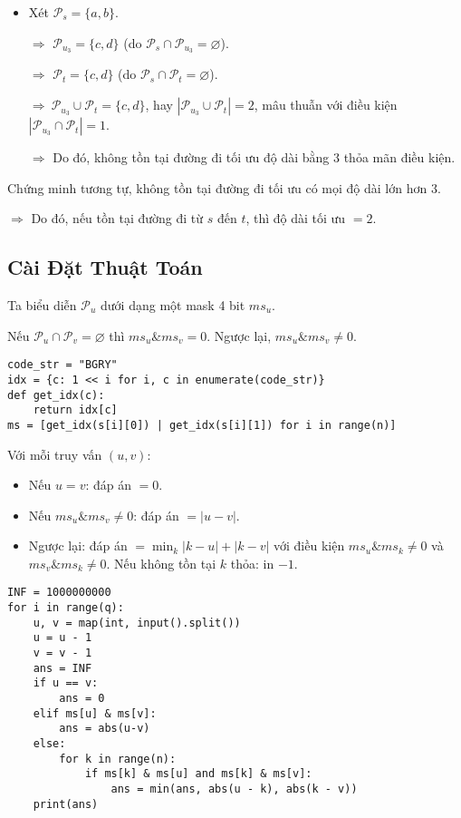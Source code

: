 \documentclass[12pt,a4paper]{article}
\begin{document}
\begin{itemize}
\begin{itemize}
		\item Xét $\mathcal{P}_s = \{a, b\}$.
		
		$\Rightarrow$ $\mathcal{P}_{u_3} = \{c, d\}$ (do $\mathcal{P}_{s} \cap \mathcal{P}_{u_3} = \varnothing$).
		
		$\Rightarrow$ $\mathcal{P}_{t} = \{c, d\}$ (do $\mathcal{P}_{s} \cap \mathcal{P}_{t} = \varnothing$).
		
		$\Rightarrow\ \mathcal{P}_{u_3} \cup \mathcal{P}_{t} = \{c, d\}$, hay $|\mathcal{P}_{u_3} \cup \mathcal{P}_{t}| = 2$, 
		mâu thuẫn với điều kiện $|\mathcal{P}_{u_3} \cap \mathcal{P}_{t}| = 1$.

		$\Rightarrow$ Do đó, không tồn tại đường đi tối ưu độ dài bằng $3$ thỏa mãn điều kiện.	

	\end{itemize}
	Chứng minh tương tự, không tồn tại đường đi tối ưu có mọi độ dài lớn hơn $3$.
	
	$\Rightarrow$ Do đó, nếu tồn tại đường đi từ $s$ đến $t$, thì độ dài tối ưu $= 2$.
	\end{itemize}

	\subsection{Cài Đặt Thuật Toán}
	
	Ta biểu diễn $\mathcal{P}_u$ dưới dạng một mask 4 bit $ms_u$.  
	
	Nếu $\mathcal{P}_u \cap \mathcal{P}_v = \varnothing$ thì $ms_u \& ms_v = 0$. 
	Ngược lại, $ms_u \& ms_v \ne 0$.
\begin{lstlisting}
code_str = "BGRY"
idx = {c: 1 << i for i, c in enumerate(code_str)}
def get_idx(c):
	return idx[c]
ms = [get_idx(s[i][0]) | get_idx(s[i][1]) for i in range(n)]
\end{lstlisting}
	Với mỗi truy vấn $(u, v)$:
	\begin{itemize}[nosep]
		\item Nếu $u = v$: đáp án $= 0$.
		\item Nếu $ms_u \& ms_v \ne 0$: đáp án $= |u - v|$.
		\item Ngược lại: đáp án $= \min_{k}|k - u| + |k - v|$ với điều kiện $ms_u \& ms_k \ne 0$ và $ms_v \& ms_k \ne 0$. Nếu không tồn tại $k$ thỏa: in $-1$.
		\end{itemize}

\begin{lstlisting}
INF = 1000000000
for i in range(q):
	u, v = map(int, input().split())
	u = u - 1
	v = v - 1
	ans = INF
	if u == v:
		ans = 0
	elif ms[u] & ms[v]:
		ans = abs(u-v)
	else:
		for k in range(n):
			if ms[k] & ms[u] and ms[k] & ms[v]:
				ans = min(ans, abs(u - k), abs(k - v))
	print(ans)
\end{lstlisting}
	
\end{document}
